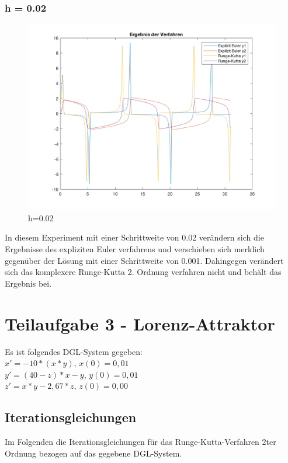 \documentclass[]{scrartcl}
\begin{document}
\subsubsection{h = 0.02}
\begin{figure}[H]
	\centering
	\includegraphics[width=1\linewidth]{a1_2_2}
	\caption{h=0.02}
	\label{fig:a1_2_2}
\end{figure}

In diesem Experiment mit einer Schrittweite von 0.02 verändern sich die Ergebnisse des expliziten Euler verfahrens und verschieben sich merklich gegenüber der Lösung mit einer Schrittweite von 0.001. Dahingegen verändert sich das komplexere Runge-Kutta 2. Ordnung verfahren nicht und behält das Ergebnis bei.

\section{Teilaufgabe 3 - Lorenz-Attraktor}
Es ist folgendes DGL-System gegeben: \\
$x' = -10 * (x*y)$, $x(0) = 0,01$ \\
$y' = (40 - z) * x - y$, $y(0) = 0,01$ \\
$z' = x * y - 2,67 * z$, $z(0) = 0,00$\\


\subsection{Iterationsgleichungen}
Im Folgenden die Iterationsgleichungen für das Runge-Kutta-Verfahren 2ter Ordnung bezogen auf das gegebene DGL-System.
\end{document}
